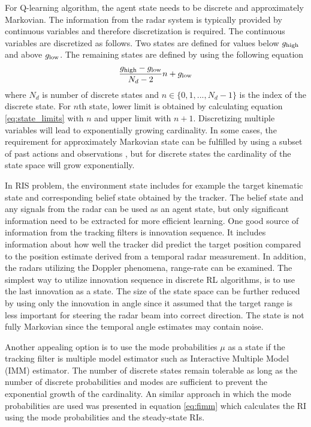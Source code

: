 \documentclass[english, 12pt, a4paper, elec, utf8, a-1b, online]{aaltothesis}
\begin{document}
For Q-learning algorithm, the agent state needs to be discrete and approximately Markovian.
The information from the radar system is typically provided by continuous variables and therefore discretization is required.
The continuous variables are discretized as follows. 
Two states are defined for values below $g_\text{high}$ and above $g_\text{low}$. 
The remaining states are defined by using the following equation 
\begin{equation}\label{eq:state_limits}
    \frac{g_\text{high} - g_\text{low}}{N_d - 2} n + g_\text{low}
\end{equation}
where $N_d$ is number of discrete states and $n \in \{0, 1, ..., N_d-1\}$ is the index of the discrete state.
For $n$th state, lower limit is obtained by calculating equation \eqref{eq:state_limits} with $n$ and upper limit with $n+1$.
Discretizing multiple variables will lead to exponentially growing cardinality.
In some cases, the requirement for approximately Markovian state can be fulfilled by using a subset of past actions and observations \cite{Mnih2013}, but for discrete states the cardinality of the state space will grow exponentially.


In RIS problem, 
the environment state includes for example the target kinematic state and corresponding belief state obtained by the tracker. 
The belief state and any signals from the radar can be used as an agent state, but only significant information need to be extracted for more efficient learning. 
One good source of information from the tracking filters is innovation sequence. 
It includes information about how well the tracker did predict the target position compared to the position estimate derived from a temporal radar measurement. 
In addition, 
the radars utilizing the Doppler phenomena, 
range-rate can be examined. 
The simplest way to utilize innovation sequence in discrete RL algorithms, is to use the last innovation as a state. 
The size of the state space can be further reduced by using only the innovation in angle since it assumed that the target range is less important for steering the radar beam into correct direction. 
The state is not fully Markovian since the temporal angle estimates may contain noise. 

Another appealing option is to use the mode probabilities $\mu$ as a state if the tracking filter is multiple model estimator such as Interactive Multiple Model (IMM) estimator. 
The number of discrete states remain tolerable as long as the number of discrete probabilities and modes are sufficient to prevent the exponential growth of the cardinality. 
An similar approach in which the mode probabilities are used was presented in equation \eqref{eq:fimm} which calculates the RI using the mode probabilities and the steady-state RIs. 
\end{document}

